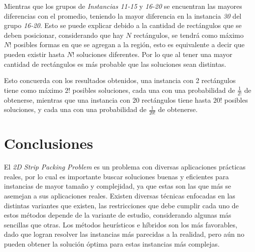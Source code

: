 \documentclass[letter, 10pt]{article}
\begin{document}
Mientras que los grupos de \emph{Instancias 11-15} y \emph{16-20} se encuentran las mayores diferencias con el promedio, teniendo la mayor diferencia en la instancia \emph{30} del grupo \emph{16-20}. Esto se puede explicar debido a la cantidad de rect\'angulos que se deben posicionar, considerando que hay $N$ rect\'angulos, se tendr\'a como m\'aximo $N!$ posibles formas en que se agregan a la regi\'on, esto es equivalente a decir que pueden existir hasta $N!$ soluciones diferentes. Por lo que al tener una mayor cantidad de rect\'angulos es m\'as probable que las soluciones sean distintas.

Esto concuerda con los resultados obtenidos, una instancia con 2 rect\'angulos tiene como m\'aximo $2!$ posibles soluciones, cada una con una probabilidad de $\frac{1}{2!}$ de obtenerse, mientras que una instancia con 20 rect\'angulos tiene hasta $20!$ posibles soluciones, y cada una con una probabilidad de $\frac{1}{20!}$ de obtenerse.

\section{Conclusiones}

El \emph{2D Strip Packing Problem} es un problema con diversas aplicaciones pr\'acticas reales, por lo cual es importante buscar soluciones buenas y eficientes para instancias de mayor tama\~no y complejidad, ya que estas son las que m\'as se asemejan a sus aplicaciones reales. Existen diversas t\'ecnicas enfocadas en las distintas variantes que existen, las restricciones que debe cumplir cada uno de estos m\'etodos depende de la variante de estudio, considerando algunas m\'as sencillas que otras. Los m\'etodos heur\'isticos e h\'ibridos son los m\'as favorables, dado que logran resolver las instancias m\'as parecidas a la realidad, pero a\'un no pueden obtener la soluci\'on \'optima para estas instancias m\'as complejas.
\end{document}
